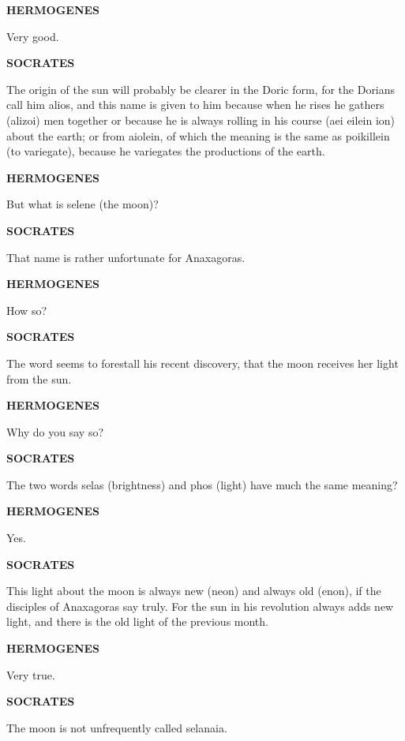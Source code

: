 \documentclass[11pt,letter]{article}
\begin{document}
\par \textbf{HERMOGENES}
\par   Very good.

\par \textbf{SOCRATES}
\par   The origin of the sun will probably be clearer in the Doric form, for the Dorians call him alios, and this name is given to him because when he rises he gathers (alizoi) men together or because he is always rolling in his course (aei eilein ion) about the earth; or from aiolein, of which the meaning is the same as poikillein (to variegate), because he variegates the productions of the earth.

\par \textbf{HERMOGENES}
\par   But what is selene (the moon)?

\par \textbf{SOCRATES}
\par   That name is rather unfortunate for Anaxagoras.

\par \textbf{HERMOGENES}
\par   How so?

\par \textbf{SOCRATES}
\par   The word seems to forestall his recent discovery, that the moon receives her light from the sun.

\par \textbf{HERMOGENES}
\par   Why do you say so?

\par \textbf{SOCRATES}
\par   The two words selas (brightness) and phos (light) have much the same meaning?

\par \textbf{HERMOGENES}
\par   Yes.

\par \textbf{SOCRATES}
\par   This light about the moon is always new (neon) and always old (enon), if the disciples of Anaxagoras say truly. For the sun in his revolution always adds new light, and there is the old light of the previous month.

\par \textbf{HERMOGENES}
\par   Very true.

\par \textbf{SOCRATES}
\par   The moon is not unfrequently called selanaia.
\end{document}
